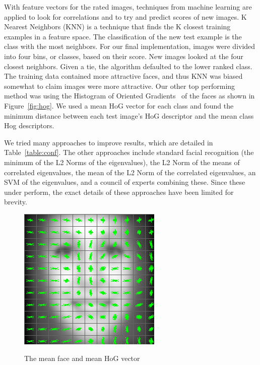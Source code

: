 \documentclass[10pt,twocolumn,letterpaper]{article}
\begin{document}
 With feature vectors for the rated images, techniques from machine learning are applied to look for correlations and 
 to try and predict scores of new images. K Nearest Neighbors (KNN) is a technique that finds the K closest training examples in a feature space. The classification of the new test example is the class with the most neighbors. For our final implementation, images were divided into four bins, or classes, based on their score. New images looked at the four closest neighbors. Given a tie, the algorithm defaulted to the lower ranked class. The training data contained more attractive faces, and thus KNN was biased somewhat to claim images were more attractive. Our other top performing method was using the Histogram of Oriented Gradients~\cite{dalal2005histograms} of the faces as shown in Figure~\ref{fig:hog}. We used a mean HoG vector for each class and found the minimum distance between each test image's HoG descriptor and the mean class Hog descriptors.

We tried many approaches to improve results, which are detailed in Table~\ref{table:conf}. The other approaches include standard facial recognition (the minimum of the L2 Norms of the eigenvalues), the L2 Norm of the means of correlated eigenvalues, the mean of the L2 Norm of the correlated eigenvalues, an SVM of the eigenvalues, and a council of experts combining these. Since these under perform, the exact details of these approaches have been limited for brevity.

\begin {figure} [h]
    \centering
        \includegraphics[width = 0.7\linewidth]{hog_desc.png}
    \label{fig:corgraph}
    \caption{The mean face and mean HoG vector}
\end {figure}
\end{document}
